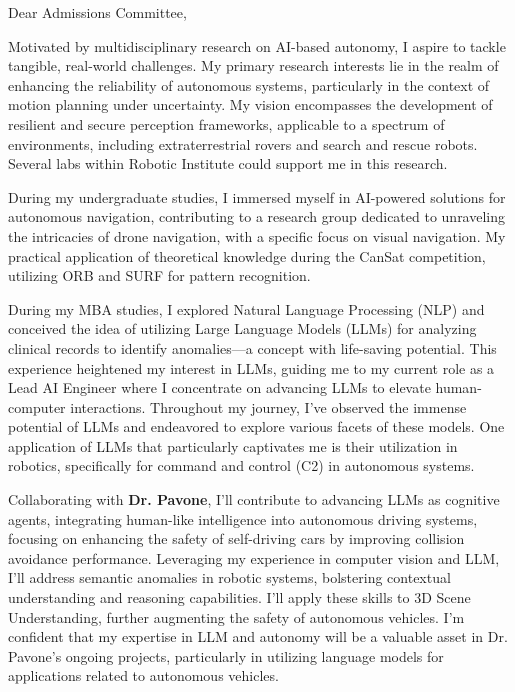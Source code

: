 \documentclass[a4,20pt]{article}
\begin{document}
\begin{large} 
Dear Admissions Committee,

Motivated by multidisciplinary research on AI-based autonomy, I aspire to tackle tangible, real-world challenges. My primary research interests lie in the realm of enhancing the reliability of autonomous systems, particularly in the context of motion planning under uncertainty. My vision encompasses the development of resilient and secure perception frameworks, applicable to a spectrum of environments, including extraterrestrial rovers and search and rescue robots. Several labs within Robotic Institute could support me in this research.




During my undergraduate studies, I immersed myself in AI-powered solutions for autonomous navigation, contributing to a research group dedicated to unraveling the intricacies of drone navigation, with a specific focus on visual navigation. My practical application of theoretical knowledge during the CanSat competition, utilizing ORB and SURF for pattern recognition.


During my MBA studies, I explored Natural Language Processing (NLP) and conceived the idea of utilizing Large Language Models (LLMs) for analyzing clinical records to identify anomalies—a concept with life-saving potential. This experience heightened my interest in LLMs, guiding me to my current role as a Lead AI Engineer where I concentrate on advancing LLMs to elevate human-computer interactions. Throughout my journey, I've observed the immense potential of LLMs and endeavored to explore various facets of these models. One application of LLMs that particularly captivates me is their utilization in robotics, specifically for command and control (C2) in autonomous systems.

Collaborating with \textbf{Dr. Pavone}, I'll contribute to advancing LLMs as cognitive agents, integrating human-like intelligence into autonomous driving systems, focusing on enhancing the safety of self-driving cars by improving collision avoidance performance. Leveraging my experience in computer vision and LLM, I'll address semantic anomalies in robotic systems, bolstering contextual understanding and reasoning capabilities. I’ll apply these skills to 3D Scene Understanding, further augmenting the safety of autonomous vehicles. I'm confident that my expertise in LLM and autonomy will be a valuable asset in Dr. Pavone's ongoing projects, particularly in utilizing language models for applications related to autonomous vehicles.


\end{large}
\end{document}
